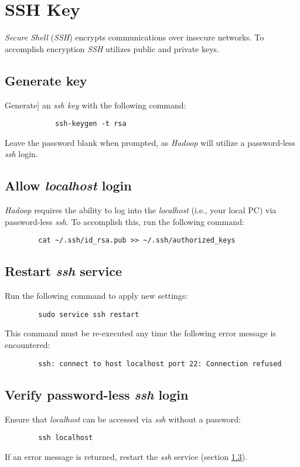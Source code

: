 \documentclass{article}
\begin{document}
\section{SSH Key}
\emph{Secure Shell} (\emph{SSH}) encrypts communications over insecure networks. To accomplish encryption
\emph{SSH} utilizes public and private keys.

    \subsection{Generate key}
     Generate] an \emph{ssh key} with the following command:
        \begin{verbatim}
            ssh-keygen -t rsa
        \end{verbatim}
    Leave the password blank when prompted, as \emph{Hadoop} will utilize a password-less \emph{ssh}
    login.

    \subsection{Allow \emph{localhost} login}
    \emph{Hadoop} requires the ability to log into the \emph{localhost} (i.e., your local PC) via
    password-less \emph{ssh}. To accomplish this, run the following command:
    \begin{verbatim}
        cat ~/.ssh/id_rsa.pub >> ~/.ssh/authorized_keys
    \end{verbatim}

    \subsection{Restart \emph{ssh} service}
    \label{subsec:sshrestart}
    Run the following command to apply new settings:
    \begin{verbatim}
        sudo service ssh restart
    \end{verbatim}
    This command must be re-executed any time the following error message is encountered:
    \begin{verbatim}
        ssh: connect to host localhost port 22: Connection refused
    \end{verbatim}

    \subsection{Verify password-less \emph{ssh} login}
    Ensure that \emph{localhost} can be accessed via \emph{ssh} without a password:
    \begin{verbatim}
        ssh localhost
    \end{verbatim}
    If an error message is returned, restart the \emph{ssh} service (section \ref{subsec:sshrestart}).
\end{document}
